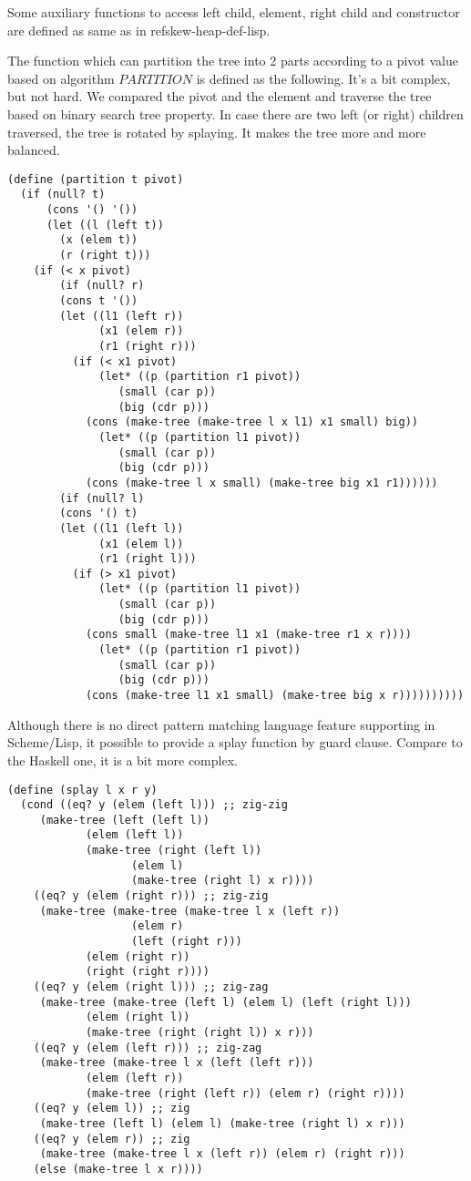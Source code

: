 \documentclass{article}
\begin{document}
Some auxiliary functions to access left child, element, right
child and constructor are defined as same as in ref{skew-heap-def-lisp}.

The function which can partition the tree into 2 parts according to 
a pivot value based on algorithm $PARTITION$ is defined as the following.
It's a bit complex, but not hard. We compared the pivot and the element
and traverse the tree based on binary search tree property. In case
there are two left (or right) children traversed, the tree is rotated
by splaying. It makes the tree more and more balanced.

\lstset{language=lisp}
\begin{lstlisting}
(define (partition t pivot)
  (if (null? t) 
      (cons '() '())
      (let ((l (left t))
	    (x (elem t))
	    (r (right t)))
	(if (< x pivot)
	    (if (null? r)
		(cons t '())
		(let ((l1 (left r))
		      (x1 (elem r))
		      (r1 (right r)))
		  (if (< x1 pivot)
		      (let* ((p (partition r1 pivot))
			     (small (car p))
			     (big (cdr p)))
			(cons (make-tree (make-tree l x l1) x1 small) big))
		      (let* ((p (partition l1 pivot))
			     (small (car p))
			     (big (cdr p)))
			(cons (make-tree l x small) (make-tree big x1 r1))))))
	    (if (null? l)
		(cons '() t)
		(let ((l1 (left l))
		      (x1 (elem l))
		      (r1 (right l)))
		  (if (> x1 pivot)
		      (let* ((p (partition l1 pivot))
			     (small (car p))
			     (big (cdr p)))
			(cons small (make-tree l1 x1 (make-tree r1 x r))))
		      (let* ((p (partition r1 pivot))
			     (small (car p))
			     (big (cdr p)))
			(cons (make-tree l1 x1 small) (make-tree big x r))))))))))
\end{lstlisting}

Although there is no direct pattern matching language feature supporting in
Scheme/Lisp, it possible to provide a splay function by guard clause.
Compare to the Haskell one, it is a bit more complex.

\begin{lstlisting}
(define (splay l x r y)
  (cond ((eq? y (elem (left l))) ;; zig-zig
	 (make-tree (left (left l)) 
		    (elem (left l))
		    (make-tree (right (left l)) 
			       (elem l) 
			       (make-tree (right l) x r))))
	((eq? y (elem (right r))) ;; zig-zig
	 (make-tree (make-tree (make-tree l x (left r))
			       (elem r)
			       (left (right r)))
		    (elem (right r))
		    (right (right r))))
	((eq? y (elem (right l))) ;; zig-zag
	 (make-tree (make-tree (left l) (elem l) (left (right l)))
		    (elem (right l))
		    (make-tree (right (right l)) x r)))
	((eq? y (elem (left r))) ;; zig-zag
	 (make-tree (make-tree l x (left (left r)))
		    (elem (left r))
		    (make-tree (right (left r)) (elem r) (right r))))
	((eq? y (elem l)) ;; zig
	 (make-tree (left l) (elem l) (make-tree (right l) x r)))
	((eq? y (elem r)) ;; zig
	 (make-tree (make-tree l x (left r)) (elem r) (right r)))
	(else (make-tree l x r))))
\end{lstlisting}
\end{document}
